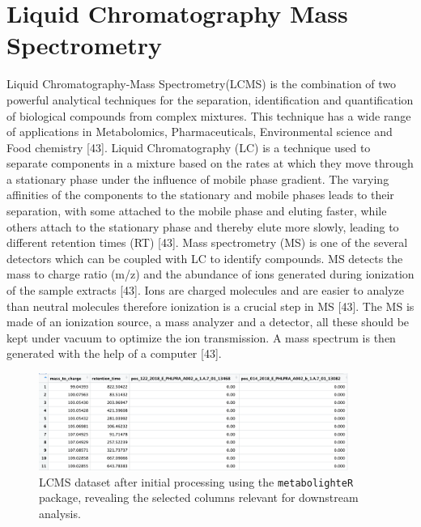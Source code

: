 \documentclass[12pt,a4paper]{report}
\begin{document}
\section{Liquid Chromatography Mass Spectrometry}
Liquid Chromatography-Mass Spectrometry(LCMS) is the combination of two powerful analytical techniques for the separation, identification and quantification of biological compounds from complex mixtures. This technique has a wide range of applications in Metabolomics, Pharmaceuticals, Environmental science and Food chemistry [43]. Liquid Chromatography (LC) 
is a technique used to separate components in a mixture based on the rates at which they move through a stationary phase under the influence of mobile phase gradient. The varying affinities of the components to the stationary and mobile phases leads to their separation, with some attached to the mobile phase and eluting faster, while others attach to 
the stationary phase and thereby elute more slowly, leading to different retention times (RT) [43]. Mass spectrometry (MS) is one of the several detectors which can be coupled with LC to identify compounds. MS detects the mass to charge ratio (m/z) and the abundance of ions generated during ionization of the sample extracts [43]. Ions are charged molecules 
and are easier to analyze than neutral molecules therefore ionization is a crucial step in MS [43]. The MS is made of an ionization source, a mass analyzer and a detector, all these should be kept under vacuum to optimize the ion transmission. A mass spectrum is then generated with the help of a computer [43]. \\

\begin{figure}[h]
    \centering
    \includegraphics[width=0.9\textwidth]{Figures/lcms_raw.png} 
    \caption{LCMS dataset after initial processing using the \texttt{metabolighteR} package, revealing the selected columns relevant for downstream analysis.}
    \label{fig:lcms_raw}
\end{figure}
\end{document}
